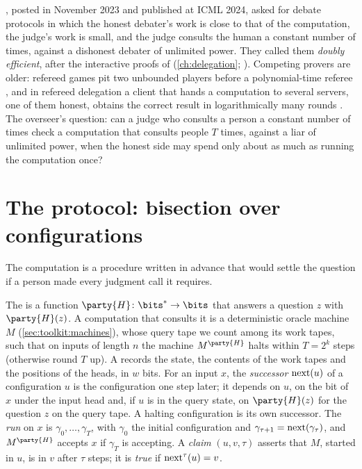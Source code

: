 \begin{refsection}
\Textcite{BrownCohenEtAl2024}, posted in November 2023 and published at ICML 2024, asked for debate protocols in which the honest debater's work is close to that of the computation, the judge's work is small, and the judge consults the human a constant number of times, against a dishonest debater of unlimited power. They called them \emph{doubly efficient}, after the interactive proofs of \textcite{GoldwasserKalaiRothblum2015} (\cref{ch:delegation}; \textcite{Goldreich2018}). Competing provers are older: refereed games pit two unbounded players before a polynomial-time referee \parencite{FeigeKilian1997}, and in refereed delegation a client that hands a computation to several servers, one of them honest, obtains the correct result in logarithmically many rounds \parencite{CanettiRivaRothblum2011,CanettiRivaRothblum2013}. The overseer's question: can a judge who consults a person a constant number of times check a computation that consults people $T$ times, against a liar of unlimited power, when the honest side may spend only about as much as running the computation once?

\section{The protocol: bisection over configurations}\label{sec:efficientdebate:protocol}

The computation is a procedure written in advance that would settle the question if a person made every judgment call it requires.

\begin{definition}\label{def:efficientdebate:computation}
The  is a function $\party{H}\colon\bits^*\to\bits$ that answers a question $z$ with $\party{H}(z)$. A computation that consults it is a deterministic oracle machine $M$ (\cref{sec:toolkit:machines}), whose query tape we count among its work tapes, such that on inputs of length $n$ the machine $M^{\party{H}}$ halts within $T=2^k$ steps (otherwise round $T$ up). A  records the state, the contents of the work tapes and the positions of the heads, in $w$ bits. For an input $x$, the \emph{successor} $\operatorname{next}(u)$ of a configuration $u$ is the configuration one step later; it depends on $u$, on the bit of $x$ under the input head and, if $u$ is in the query state, on $\party{H}(z)$ for the question $z$ on the query tape. A halting configuration is its own successor. The \emph{run} on $x$ is $\gamma_0,\dots,\gamma_T$, with $\gamma_0$ the initial configuration and $\gamma_{\tau+1}=\operatorname{next}(\gamma_\tau)$, and $M^{\party{H}}$ accepts $x$ if $\gamma_T$ is accepting. A \emph{claim} $(u,v,\tau)$ asserts that $M$, started in $u$, is in $v$ after $\tau$ steps; it is \emph{true} if $\operatorname{next}^{\tau}(u)=v$.
\end{definition}


\end{refsection}
